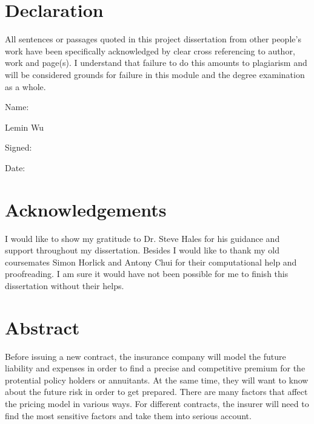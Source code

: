 \documentclass{report}
\begin{document}
\chapter*{Declaration}                %
All sentences or passages quoted in this project dissertation from other
people's work have been specifically acknowledged by clear cross referencing
to author, work and page(s).  I understand that failure to do this amounts
to plagiarism and will be considered grounds for failure in this module and
the degree examination as a whole.

\bigskip

\noindent
Name:

Lemin Wu\\


\bigskip

\noindent
Signed:


\bigskip

\noindent
Date:



\chapter*{Acknowledgements}


I would like to show my gratitude to Dr. Steve Hales for his guidance and support throughout my dissertation. Besides I would like to thank my old coursemates Simon Horlick and Antony Chui for their computational help and proofreading. I am sure it would have not been possible for me to finish this dissertation without their helps.


\chapter*{Abstract}

Before issuing a new contract, the insurance company will model the future liability and expenses in order to find a precise and competitive premium for the protential policy holders or annuitants. At the same time, they will want to know about the future risk in order to get prepared. There are many factors that affect the pricing model in various ways. For different contracts, the insurer will need to find the most sensitive factors and take them into serious account. 
\end{document}
